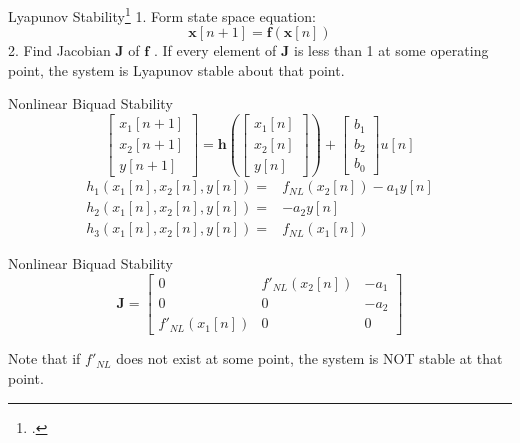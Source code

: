 \begin{frame}{Lyapunov Stability\footcite{Lyapunov}}
    1. Form state space equation:
    \begin{equation}
        \mathbf{x}[n+1] = \mathbf{f}(\mathbf{x}[n])
    \end{equation}
    2. Find Jacobian $\mathbf{J}$ of $\mathbf{f}$
    \newline{}. If every element of $\mathbf{J}$ is less than 1
    at some operating point, the system is Lyapunov
    stable about that point.
\end{frame}

\begin{frame}{Nonlinear Biquad Stability}
    \begin{equation}
        \begin{bmatrix} x_1[n+1] \\ x_2[n+1] \\ y[n+1] \end{bmatrix} =
        \mathbf{h} \left( \begin{bmatrix} x_1[n] \\ x_2[n] \\ y[n] \end{bmatrix}
        \right) + \begin{bmatrix} b_1\\ b_2\\ b_0 \end{bmatrix} u[n]
    \end{equation}
    \vspace{3ex}
    \begin{equation}
        \begin{split}
            h_1(x_1[n], x_2[n], y[n]) =& f_{NL}(x_2[n]) - a_1y[n] \\
            h_2(x_1[n], x_2[n], y[n]) =& -a_2y[n] \\
            h_3(x_1[n], x_2[n], y[n]) =& f_{NL}(x_1[n])
        \end{split}
    \end{equation}
\end{frame}

\begin{frame}{Nonlinear Biquad Stability}
    \begin{equation}
        \mathbf{J} = \begin{bmatrix}
            0& f'_{NL}(x_2[n])& -a_1 \\
            0& 0& -a_2 \\
            f'_{NL}(x_1[n])& 0& 0
        \end{bmatrix}
    \end{equation}

    \vspace{3ex}

    Note that if $f'_{NL}$ does not exist at some point,
    the system is NOT stable at that point.
\end{frame}

